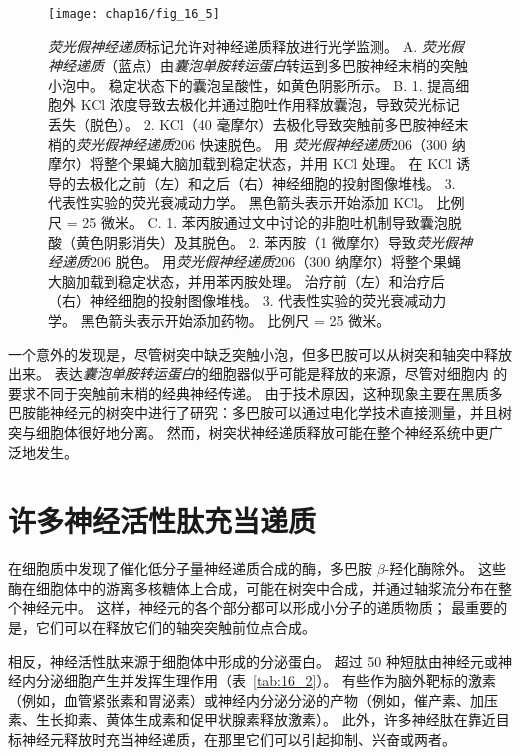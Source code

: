 \begin{figure}[htbp]
	\centering
	\texttt{[image: chap16/fig\_16\_5]}
	\caption{\textit{荧光假神经递质}标记允许对神经递质释放进行光学监测。
		A. \textit{荧光假神经递质}（蓝点）由\textit{囊泡单胺转运蛋白}转运到多巴胺神经末梢的突触小泡中。
		稳定状态下的囊泡呈酸性，如黄色阴影所示。
		B. 1. 提高细胞外 KCl 浓度导致去极化并通过胞吐作用释放囊泡，导致荧光标记丢失（脱色）。
		2. KCl（40 毫摩尔）去极化导致突触前多巴胺神经末梢的\textit{荧光假神经递质}206 快速脱色。
		用 \textit{荧光假神经递质}206（300 纳摩尔）将整个果蝇大脑加载到稳定状态，并用 KCl 处理。
		在 KCl 诱导的去极化之前（左）和之后（右）神经细胞的投射图像堆栈。
		3. 代表性实验的荧光衰减动力学。
		黑色箭头表示开始添加 KCl。
		比例尺 = 25 微米。
		C. 
		1. 苯丙胺通过文中讨论的非胞吐机制导致囊泡脱酸（黄色阴影消失）及其脱色。
		2. 苯丙胺（1 微摩尔）导致\textit{荧光假神经递质}206 脱色。
		用\textit{荧光假神经递质}206（300 纳摩尔）将整个果蝇大脑加载到稳定状态，并用苯丙胺处理。
		治疗前（左）和治疗后（右）神经细胞的投射图像堆栈。
		3. 代表性实验的荧光衰减动力学。
		黑色箭头表示开始添加药物。
		比例尺 = 25 微米。}
	\label{fig:16_5}
\end{figure}


一个意外的发现是，尽管树突中缺乏突触小泡，但多巴胺可以从树突和轴突中释放出来。
表达\textit{囊泡单胺转运蛋白}的细胞器似乎可能是释放的来源，尽管对细胞内  的要求不同于突触前末梢的经典神经传递。
由于技术原因，这种现象主要在黑质多巴胺能神经元的树突中进行了研究：多巴胺可以通过电化学技术直接测量，并且树突与细胞体很好地分离。
然而，树突状神经递质释放可能在整个神经系统中更广泛地发生。



\section{许多神经活性肽充当递质}

在细胞质中发现了催化低分子量神经递质合成的酶，多巴胺 $\beta$-羟化酶除外。
这些酶在细胞体中的游离多核糖体上合成，可能在树突中合成，并通过轴浆流分布在整个神经元中。
这样，神经元的各个部分都可以形成小分子的递质物质； 最重要的是，它们可以在释放它们的轴突突触前位点合成。


相反，神经活性肽来源于细胞体中形成的分泌蛋白。
超过 50 种短肽由神经元或神经内分泌细胞产生并发挥生理作用（表~\ref{tab:16_2}）。
有些作为脑外靶标的激素（例如，血管紧张素和胃泌素）或神经内分泌分泌的产物（例如，催产素、加压素、生长抑素、黄体生成素和促甲状腺素释放激素）。
此外，许多神经肽在靠近目标神经元释放时充当神经递质，在那里它们可以引起抑制、兴奋或两者。


